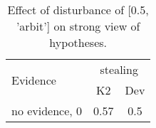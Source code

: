 \begin{table}\begin{tabular}{l|cc}\toprule\multirow{2}{*}{Evidence} & \multicolumn{2}{c}{stealing}\\& {K2} & {Dev}\\\midrule
no evidence, 0 & \cellcolor{Bittersweet}0.57&\cellcolor{Bittersweet}0.5\\\bottomrule\end{tabular}\caption{Effect of disturbance of [0.5, 'arbit'] on strong view of hypotheses.}\end{table}